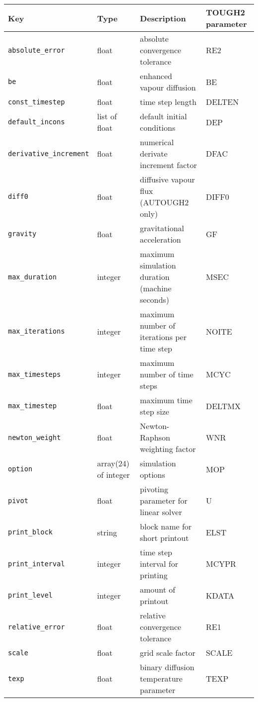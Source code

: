 \begin{sidewaystable}
  \begin{center}
    \begin{tabular}{|l|l|l|l|}
      \hline
      \textbf{Key} & \textbf{Type} & \textbf{Description} & \textbf{TOUGH2 parameter}\\
      \hline
      \texttt{absolute\_error} & float & absolute convergence tolerance & RE2\\
      \texttt{be} & float & enhanced vapour diffusion & BE\\
      \texttt{const\_timestep} & float & time step length & DELTEN\\
      \texttt{default\_incons} & list of float & default initial conditions & DEP\\
      \texttt{derivative\_increment} & float & numerical derivate increment factor & DFAC\\
      \texttt{diff0} & float & diffusive vapour flux (AUTOUGH2 only) & DIFF0\\
      \texttt{gravity} & float & gravitational acceleration & GF\\
      \texttt{max\_duration} & integer & maximum simulation duration (machine seconds) & MSEC\\
      \texttt{max\_iterations} & integer & maximum number of iterations per time step & NOITE\\
      \texttt{max\_timesteps} & integer & maximum number of time steps & MCYC\\
      \texttt{max\_timestep} & float & maximum time step size & DELTMX\\
      \texttt{newton\_weight} & float & Newton-Raphson weighting factor & WNR\\
      \texttt{option} & array(24) of integer & simulation options & MOP\\
      \texttt{pivot} & float & pivoting parameter for linear solver & U\\
      \texttt{print\_block} & string & block name for short printout & ELST\\
      \texttt{print\_interval} & integer & time step interval for printing & MCYPR\\
      \texttt{print\_level} & integer & amount of printout & KDATA\\
      \texttt{relative\_error} & float & relative convergence tolerance & RE1\\
      \texttt{scale} & float & grid scale factor & SCALE\\
      \texttt{texp} & float & binary diffusion temperature parameter & TEXP\\

\end{tabular}
\end{center}
\end{sidewaystable}
